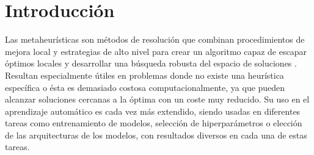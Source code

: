 \section{Introducción}













%



Las metaheurísticas \cite{MHDef} son métodos de resolución que combinan procedimientos de mejora local y estrategias de alto nivel para crear un algoritmo capaz de escapar óptimos locales y desarrollar una búsqueda robusta del espacio de soluciones . Resultan especialmente útiles en problemas donde no existe una heurística específica o ésta es demasiado costosa computacionalmente, ya que pueden alcanzar soluciones cercanas a la óptima con un coste muy reducido. Su uso en el aprendizaje automático es cada vez más extendido, siendo usadas en diferentes tareas como entrenamiento de modelos, selección de hiperparámetros o elección de las arquitecturas de los modelos, con resultados diversos en cada una de estas tareas. 


